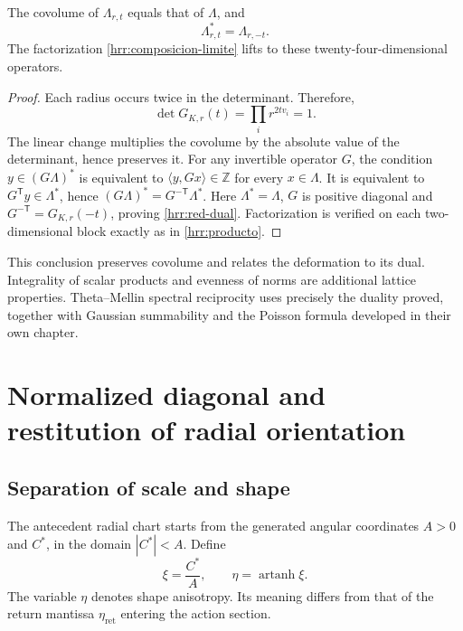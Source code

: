 \begin{proposition}
\label{hrr:redes} The covolume of \(\Lambda_{r,t}\) equals that of \(\Lambda\), and
\begin{equation}
 \Lambda_{r,t}^{*}=\Lambda_{r,-t}.
 \label{hrr:red-dual}
\end{equation}
The factorization \eqref{hrr:composicion-limite} lifts to these twenty-four-dimensional operators.
\end{proposition}
\begin{proof}
Each radius occurs twice in the determinant. Therefore,
\[
 \det G_{K,r}(t)=\prod_i r^{2tv_i}=1.
\]
The linear change multiplies the covolume by the absolute value of the determinant, hence preserves it. For any invertible operator \(G\), the condition \(y\in(G\Lambda)^*\) is equivalent to \(\langle y,Gx\rangle\in\mathbb Z\) for every \(x\in\Lambda\). It is equivalent to \(G^{\mathsf T}y\in\Lambda^*\), hence \((G\Lambda)^*=G^{-\mathsf T}\Lambda^*\). Here \(\Lambda^*=\Lambda\), \(G\) is positive diagonal and \(G^{-\mathsf T}=G_{K,r}(-t)\), proving \eqref{hrr:red-dual}. Factorization is verified on each two-dimensional block exactly as in \eqref{hrr:producto}.
\end{proof}

This conclusion preserves covolume and relates the deformation to its dual. Integrality of scalar products and evenness of norms are additional lattice properties. Theta--Mellin spectral reciprocity uses precisely the duality proved, together with Gaussian summability and the Poisson formula developed in their own chapter.

\section{Normalized diagonal and restitution of radial orientation}
\label{hrr:diagonal}

\subsection{Separation of scale and shape}

The antecedent radial chart starts from the generated angular coordinates \(A>0\) and \(C^*\), in the domain \(|C^*|<A\). Define
\[
 \xi=\frac{C^*}{A},\qquad
 \eta=\operatorname{artanh}\xi.
\]
The variable \(\eta\) denotes shape anisotropy. Its meaning differs from that of the return mantissa \(\eta_{\mathrm{ret}}\) entering the action section.

